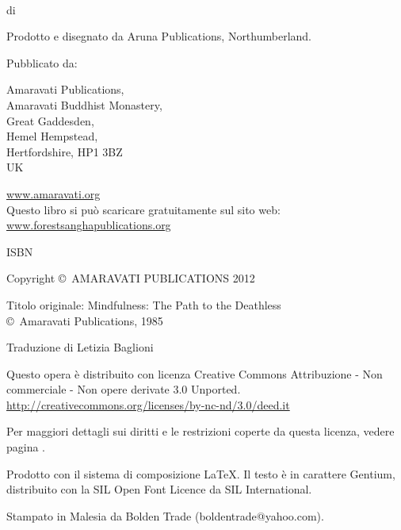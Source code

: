 {\small\setlength{\parskip}{0.8em}\setlength{\parindent}{0em}%
{\raggedright%

\thetitle\\
di \theauthor

Prodotto e disegnato da Aruna Publications, Northumberland.

Pubblicato da:

Amaravati Publications,\\
Amaravati Buddhist Monastery,\\
Great Gaddesden, \\
Hemel Hempstead, \\
Hertfordshire, HP1 3BZ\\
UK

\href{http://amaravati.org}{www.amaravati.org}\\

Questo libro si può scaricare gratuitamente sul sito web:\\
\href{http://forestsanghapublications.org/}{www.forestsanghapublications.org}

ISBN \theISBN

Copyright \copyright\ AMARAVATI PUBLICATIONS 2012


Titolo originale: Mindfulness: The Path to the Deathless\\
\copyright\ Amaravati Publications, 1985

Traduzione di Letizia Baglioni


\vfill

{\footnotesize

Questo opera è distribuito con licenza Creative Commons Attribuzione - Non commerciale - Non opere derivate 3.0 Unported.\\
\href{http://creativecommons.org/licenses/by-nc-nd/3.0/deed.it}{http://creativecommons.org/licenses/by-nc-nd/3.0/deed.it}

Per maggiori dettagli sui diritti e le restrizioni coperte da questa licenza, vedere pagina \pageref{copyright-details}.

Prodotto con il sistema di composizione {\selectfont\LaTeX}. Il testo è in carattere Gentium, distribuito con la SIL Open Font Licence da SIL International.

\theEditionInfo

Stampato in Malesia da Bolden Trade (boldentrade@yahoo.com).

}

}}

